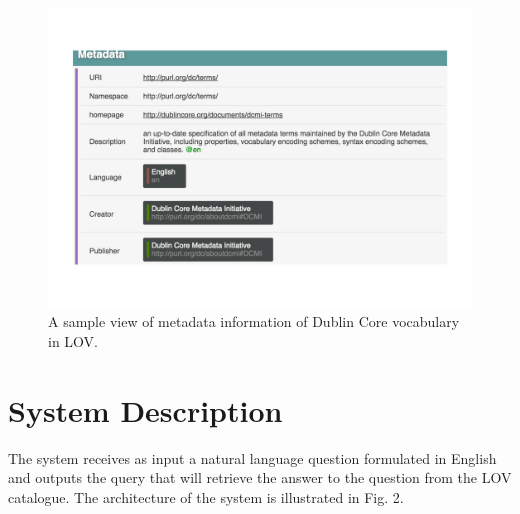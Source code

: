 \documentclass{acm}
\begin{document}
\begin{figure}[ht!b]
\centering
\caption{A sample view of metadata information of Dublin Core vocabulary in LOV.}
\includegraphics[scale=.6]{sample-metadata.pdf}

\label{fig:metadata}
\end{figure}




\section{System Description}
\label{sec:system}

The system receives as input a natural language question formulated in English
and outputs the query that will retrieve the answer to the question from the
LOV catalogue. The architecture of the system is illustrated in Fig. 2.
\end{document}
